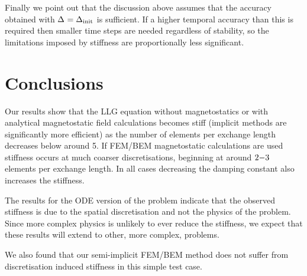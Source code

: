 Finally we point out that the discussion above assumes that the accuracy obtained with $\Delta_{} = \Delta_{\mathrm{init}}$ is sufficient.
If a higher temporal accuracy than this is required then smaller time steps are needed regardless of stability, so the limitations imposed by stiffness are proportionally less significant.


\section{Conclusions}
Our results show that the LLG equation without magnetostatics or with analytical magnetostatic field calculations becomes stiff (\ie implicit methods are significantly more efficient) as the number of elements per exchange length decreases below around 5.
If FEM/BEM magnetostatic calculations are used stiffness occurs at much coarser discretisations, beginning at around $2\mathrm{-} 3$ elements per exchange length.
In all cases decreasing the damping constant also increases the stiffness.

The results for the ODE version of the problem indicate that the observed stiffness is due to the spatial discretisation and not the physics of the problem.
Since more complex physics is unlikely to ever reduce the stiffness, we expect that these results will extend to other, more complex, problems.

We also found that our semi-implicit FEM/BEM method does not suffer from discretisation induced stiffness in this simple test case.


